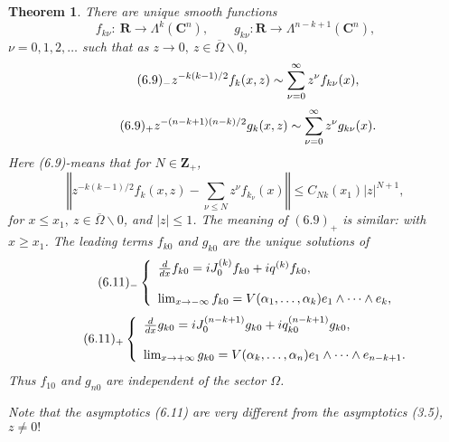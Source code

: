 \documentclass{surv-l}
\theoremstyle{plain}
\newtheorem{theorem}{Theorem}[section]
\theoremstyle{definition}
\numberwithin{equation}{chapter}
\begin{document}
\begin{theorem}\label{chap01:thm6.7}
There are unique smooth functions
\setcounter{equation}{7}
\begin{equation}\label{eq6.8}
f_{k\nu}:\ \mathbf{R}\rightarrow\Lambda^{k}(\mathbf{C}^{n}),\qquad g_{k\nu}:\mathbf{R}\rightarrow\Lambda^{n-k+1}(\mathbf{C}^{n}),
\end{equation}
$\nu=0,1,2,\ldots$ such that as $z\rightarrow 0,\ z\in\overline{\Omega}\backslash 0$, 
\begin{equation*}
\tag*{$(6.9)_{-}$}  z^{-k(k-1)/2}f_{k}(x, z)\displaystyle \sim\sum_{\nu=0}^{\infty}z^{\nu}f_{k\nu}(x),
\end{equation*}
\begin{equation*}
\tag*{$(6.9)_{+}$}  z^{-(n-k+1)(n-k)/2}g_{k}(x,z)\displaystyle \sim\sum_{\nu=0}^{\infty}z^{\nu}g_{k\nu}(x).
\end{equation*}
Here \emph{(6.9)}-means that for $N\in \mathbf{Z}_{+}$,
\setcounter{equation}{9}
\begin{equation}\label{eq6.10}
\left\Vert z^{-k(k-1)/2}f_{k}(x,z)-\sum_{\nu\leq N}z^{\nu}f_{k_{\nu}}(x)\right\Vert\leq
C_{Nk}(x_{1})|z|^{N+1},
\end{equation}
for $x\leq x_{1},\ z\in\overline{\Omega}\backslash 0$, and $|z|\leq 1$. The meaning of $(6.9)_{+}$ is similar\emph{:} with $x\geq x_{1}$. The leading terms $f_{k0}$ and $g_{k0}$ are the unique solutions of
\begin{align*}
\tag*{$(6.11)_{-}$}   \left\{\begin{array}{l}
\frac{d}{dx}f_{k0}=iJ_{0}^{(k)}f_{k0}+iq^{(k)}f_{k0},\\
\\
\lim_{x\rightarrow-\infty}f_{k0}= V(\alpha_{1},\ldots,\alpha_{k})e_{1}\wedge\cdots\wedge e_{k},
\end{array}\right.
\end{align*}
\begin{align*}
\tag*{$(6.11)_{+}$}   \left\{\begin{array}{l}
\frac{d}{dx}g_{k0}=iJ_{0}^{(n-k+1)}g_{k0}+iq_{k0}^{(n-k+1)}g_{k0},\\
\\
\lim_{x\rightarrow+\infty}g_{k0}= V(\alpha_{k},\ldots,\alpha_{n})e_{1}\wedge\cdots\wedge e_{n-k+1}.
       \end{array}\right.
\end{align*}
Thus $f_{10}$ and $g_{n0}$ are independent of the sector $\Omega$.

Note that the asymptotics \emph{(6.11)} are very different from the
asymptotics \emph{(3.5)}, $z\neq 0!$
\end{theorem}
\end{document}
